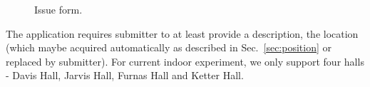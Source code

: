 \documentclass{acm_proc_article-sp}
\begin{document}
\begin{figure}[!t]
 \caption{Issue form.} \label{fig:form}
 \end{figure}
 The application requires submitter to at least provide a description, the location (which maybe acquired automatically as described in 
 Sec.~\ref{sec:position} or replaced by submitter). For current indoor experiment, we only support four halls - Davis Hall, Jarvis Hall, 
 Furnas Hall and Ketter Hall.
\end{document}
